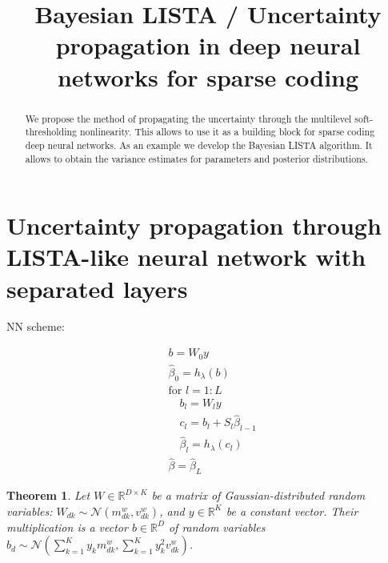 \documentclass[letterpaper]{article}
\title{Bayesian LISTA / Uncertainty propagation in deep neural networks for sparse coding}
\author{} %
\newtheorem{theorem}{Theorem}
\begin{document}
\maketitle

\begin{abstract}
We propose the method of propagating the uncertainty through the multilevel soft-thresholding nonlinearity. This allows to use it as a building block for sparse coding deep neural networks. As an example we develop the Bayesian LISTA algorithm. It allows to obtain the variance estimates for parameters and posterior distributions.
\end{abstract}

\section{Uncertainty propagation through LISTA-like neural network with separated layers}

NN scheme:

\begin{align}
&b = W_0y\\
&\widehat{\beta}_0 = h_\lambda(b) \\
&\text{for } l=1:L\\
	&\quad b_l = W_l y \\
	&\quad c_l = b_l + S_l\widehat{\beta}_{l-1} \\
	&\quad \widehat{\beta}_{l} = h_\lambda(c_l) \\
& \widehat{\beta} = \widehat{\beta}_{L}
\end{align}

 \begin{theorem}
 Let $W \in \mathbb{R}^{D \times K}$ be a matrix of Gaussian-distributed random variables: $W_{dk} \sim \mathcal{N}(m^w_{dk}, v^w_{dk})$, and $y \in \mathbb{R}^K$ be a constant vector. Their multiplication is a vector $b \in \mathbb{R}^{D}$ of random variables $b_d \sim \mathcal{N}(\sum_{k=1}^Ky_km^w_{dk}, \sum_{k=1}^Ky_k^2v^w_{dk})$.
 \end{theorem}
\end{document}
